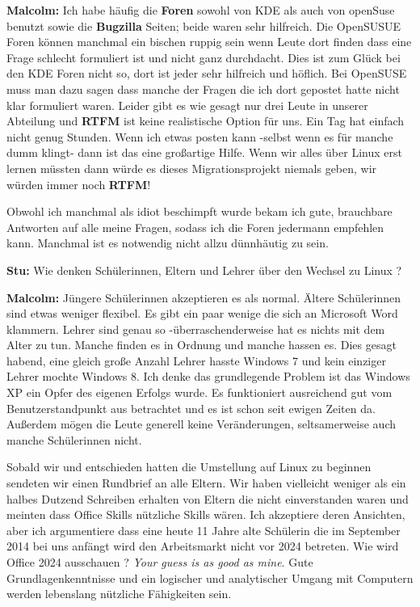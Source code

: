 \textbf{Malcolm:} Ich habe häufig die \textbf{Foren} sowohl von KDE als auch von openSuse benutzt sowie die \textbf{Bugzilla} Seiten; beide waren sehr hilfreich. Die OpenSUSUE Foren können manchmal ein bischen ruppig sein wenn Leute dort finden dass eine Frage schlecht formuliert ist und nicht ganz durchdacht. Dies ist zum Glück bei den KDE Foren nicht so, dort ist jeder sehr hilfreich und höflich. Bei OpenSUSE muss man dazu sagen dass manche der Fragen die ich dort gepostet hatte nicht klar formuliert waren. Leider gibt es wie gesagt nur drei Leute in unserer Abteilung und \textbf{RTFM} ist keine realistische Option für uns. Ein Tag hat einfach nicht genug Stunden. Wenn ich etwas posten kann -selbst wenn es für manche dumm klingt- dann ist das eine großartige Hilfe. Wenn wir alles über Linux erst lernen müssten dann würde es dieses Migrationsprojekt niemals geben, wir würden immer noch \textbf{RTFM}!

Obwohl ich manchmal als idiot beschimpft wurde bekam ich gute, brauchbare Antworten auf alle meine Fragen, sodass ich die Foren jedermann empfehlen kann. Manchmal ist es notwendig nicht allzu dünnhäutig zu sein.

\textbf{Stu:} Wie denken Schülerinnen, Eltern und Lehrer über den Wechsel zu Linux ?


\textbf{Malcolm:} Jüngere Schülerinnen akzeptieren es als normal. Ältere Schülerinnen sind etwas weniger flexibel. Es gibt ein paar wenige die sich an Microsoft Word klammern. Lehrer sind genau so -überraschenderweise hat es nichts mit dem Alter zu tun. Manche finden es in Ordnung und manche hassen es. Dies gesagt habend, eine gleich große Anzahl Lehrer hasste Windows 7 und kein einziger Lehrer mochte Windows 8. Ich denke das grundlegende Problem ist das Windows XP ein Opfer des eigenen Erfolgs wurde. Es funktioniert ausreichend gut vom Benutzerstandpunkt aus betrachtet und es ist schon seit ewigen Zeiten da. Außerdem mögen die Leute generell keine Veränderungen, seltsamerweise auch manche Schülerinnen nicht. 

Sobald wir und entschieden hatten die Umstellung auf Linux zu beginnen sendeten wir einen Rundbrief an alle Eltern. Wir haben vielleicht weniger als ein halbes Dutzend Schreiben erhalten von Eltern die nicht einverstanden waren und meinten dass Office Skills nützliche Skills wären. Ich akzeptiere deren Ansichten, aber ich argumentiere dass eine heute 11 Jahre alte Schülerin die im September 2014 bei uns anfängt wird den Arbeitsmarkt nicht vor 2024 betreten. Wie wird Office 2024 ausschauen ? \emph{Your guess is as good as mine}. Gute Grundlagenkenntnisse und ein logischer und analytischer Umgang mit Computern werden lebenslang nützliche Fähigkeiten sein.

